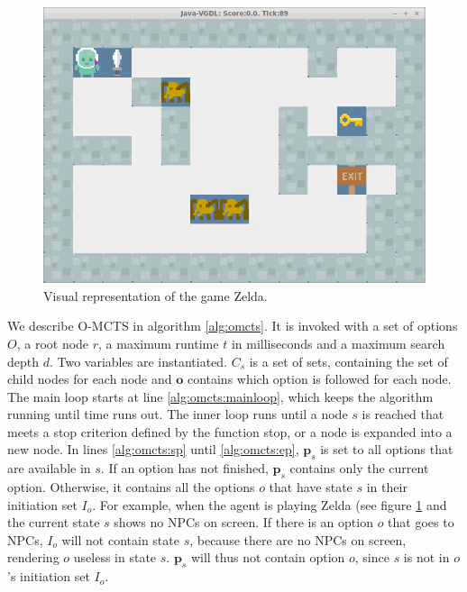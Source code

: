 \begin{figure}
	\centering
	\includegraphics[width=\columnwidth]{includes/zelda}
	\caption{Visual representation of the game Zelda.}
	\label{fig:zelda}
\end{figure}


We describe O-MCTS in algorithm \ref{alg:omcts}. It is invoked with a set of
options $O$, a root node $r$, a maximum runtime $t$ in milliseconds and a
maximum search depth $d$. Two variables are instantiated. $C_s$ is a set of
sets, containing the set of child nodes for each node and $\mathbf{o}$ contains
which option is followed for each node. The main loop starts at line
\ref{alg:omcts:mainloop}, which keeps the algorithm running until time runs out.
The inner loop runs until a node $s$ is reached that meets a stop criterion
defined by the function \textsf{stop}, or a node is expanded into a new node.
In lines \ref{alg:omcts:sp} until \ref{alg:omcts:ep}, $\mathbf{p}_s$ is set to
all options that are available in $s$. If an option has not finished,
$\mathbf{p}_s$ contains only the current option. Otherwise, it contains all the options $o$ that have state $s$ in their
initiation set $I_o$. For example, when the agent is playing Zelda (see figure
\ref{fig:zelda} and the current
state $s$ shows no NPCs on screen. If there is an option $o$ that goes to NPCs,
$I_o$ will not contain state $s$, because there are no NPCs on screen, rendering
$o$ useless in state $s$. $\mathbf{p}_s$ will thus not contain option $o$, since
$s$ is not in $o$'s initiation set $I_o$.

